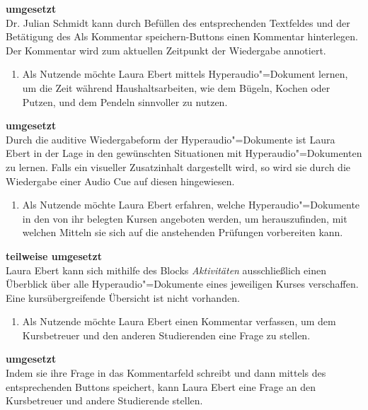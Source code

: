 \vspace{-0.25cm}
\textbf{umgesetzt}\\
Dr. Julian Schmidt kann durch Befüllen des entsprechenden Textfeldes und der Betätigung des \glqq Als Kommentar speichern\grqq{}-Buttons einen Kommentar hinterlegen. Der Kommentar wird zum aktuellen Zeitpunkt der Wiedergabe annotiert.
\vspace{0.25cm}
\begin{enumerate}[resume*]
\item \label{US-Zeit-Eval} Als Nutzende möchte Laura Ebert mittels Hyperaudio"=Dokument lernen, um die Zeit während Haushaltsarbeiten, wie dem Bügeln, Kochen oder Putzen, und dem Pendeln sinnvoller zu nutzen.
\end{enumerate}
\vspace{-0.1cm}
\textbf{umgesetzt}\\
Durch die auditive Wiedergabeform der Hyperaudio"=Dokumente ist Laura Ebert in der Lage in den gewünschten Situationen mit Hyperaudio"=Dokumenten zu lernen. Falls ein visueller Zusatzinhalt dargestellt wird, so wird sie durch die Wiedergabe einer Audio Cue auf diesen hingewiesen.
\vspace{0.25cm}
\begin{enumerate}[resume*]
\item \label{US-Uebersicht-Kurse-Eval} Als Nutzende möchte Laura Ebert erfahren, welche Hyperaudio"=Dokumente in den von ihr belegten Kursen angeboten werden, um herauszufinden, mit welchen Mitteln sie sich auf die anstehenden Prüfungen vorbereiten kann.
\end{enumerate}
\vspace{-0.1cm}
\textbf{teilweise umgesetzt}\\
Laura Ebert kann sich mithilfe des Blocks \textit{Aktivitäten} ausschließlich einen Überblick über alle Hyperaudio"=Dokumente eines jeweiligen Kurses verschaffen. Eine kursübergreifende Übersicht ist nicht vorhanden.
\vspace{0.25cm}
\begin{enumerate}[resume*]
\item \label{US-Kommentar-S-Eval} Als Nutzende möchte Laura Ebert einen Kommentar verfassen, um dem Kursbetreuer und den anderen Studierenden eine Frage zu stellen.
\end{enumerate}
\vspace{-0.1cm}
\textbf{umgesetzt}\\
Indem sie ihre Frage in das Kommentarfeld schreibt und dann mittels des entsprechenden Buttons speichert, kann Laura Ebert eine Frage an den Kursbetreuer und andere Studierende stellen.
